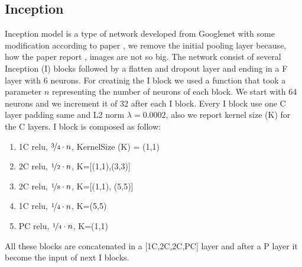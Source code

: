 \documentclass[10pt,twocolumn,letterpaper]{article}
\begin{document}
\subsection{Inception}
\label{subsection:Inception}
Inception model is a type of network developed from Googlenet \cite{13} with some modification according to paper \cite{147}, we remove the initial pooling layer because, how the paper report \cite{147}, images are not so big. The network consist of several Inception (I) blocks followed by a flatten and dropout layer and ending in a F layer with 6 neurons. For creatinig the I block we used a function that took a parameter $n$ representing the number of neurons of each block. We start with 64 neurons and we increment it of 32 after each I block. Every I block  use one C layer padding same and L2 norm $\lambda=0.0002$, also we report kernel size (K) for the C layers. I block is composed as follow:
\begin{enumerate}[noitemsep]%
   \item 1C relu, $\nicefrac{3}{4}\cdot n$, KernelSize (K) = (1,1)
   \item 2C relu, $\nicefrac{1}{2}\cdot n$, K=[(1,1),(3,3)]
   \item 2C relu, $\nicefrac{1}{8}\cdot n$, K=[(1,1), (5,5)]
   \item 1C relu, $\nicefrac{1}{4}\cdot n$, K=(5,5)
   \item PC relu, $\nicefrac{1}{4}\cdot n$, K=(1,1)
\end{enumerate}
All these blocks are concatenated in a [1C,2C,2C,PC] layer and after a P layer it become the input of next I blocks.
\end{document}
